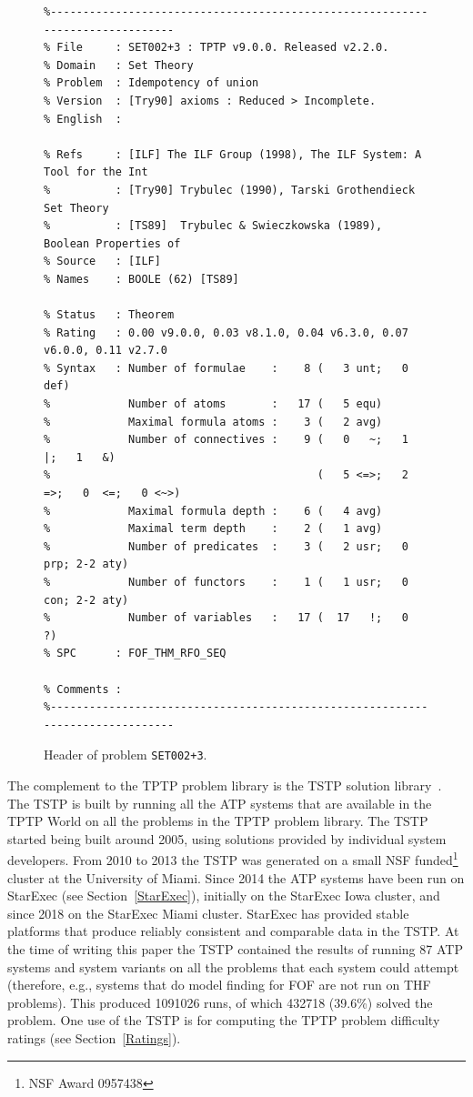 \documentclass[runningheads]{llncs}
\begin{document}
\begin{figure}[htb]
\centering
{\scriptsize
{\setlength{\baselineskip}{2.5mm}
\begin{verbatim}
%------------------------------------------------------------------------------
% File     : SET002+3 : TPTP v9.0.0. Released v2.2.0.
% Domain   : Set Theory
% Problem  : Idempotency of union
% Version  : [Try90] axioms : Reduced > Incomplete.
% English  :

% Refs     : [ILF] The ILF Group (1998), The ILF System: A Tool for the Int
%          : [Try90] Trybulec (1990), Tarski Grothendieck Set Theory
%          : [TS89]  Trybulec & Swieczkowska (1989), Boolean Properties of
% Source   : [ILF]
% Names    : BOOLE (62) [TS89]

% Status   : Theorem
% Rating   : 0.00 v9.0.0, 0.03 v8.1.0, 0.04 v6.3.0, 0.07 v6.0.0, 0.11 v2.7.0
% Syntax   : Number of formulae    :    8 (   3 unt;   0 def)
%            Number of atoms       :   17 (   5 equ)
%            Maximal formula atoms :    3 (   2 avg)
%            Number of connectives :    9 (   0   ~;   1   |;   1   &)
%                                         (   5 <=>;   2  =>;   0  <=;   0 <~>)
%            Maximal formula depth :    6 (   4 avg)
%            Maximal term depth    :    2 (   1 avg)
%            Number of predicates  :    3 (   2 usr;   0 prp; 2-2 aty)
%            Number of functors    :    1 (   1 usr;   0 con; 2-2 aty)
%            Number of variables   :   17 (  17   !;   0   ?)
% SPC      : FOF_THM_RFO_SEQ

% Comments :
%------------------------------------------------------------------------------
\end{verbatim}
}}
\caption{Header of problem {\tt SET002+3}.}
\label{ExampleHeader}
\end{figure}

The complement to the TPTP problem library is the TSTP solution library~\cite{Sut07-CSR,Sut10}.
The TSTP is built by running all the ATP systems that are available in the TPTP World on
all the problems in the TPTP problem library.
The TSTP started being built around 2005, using solutions provided by individual system developers.
From 2010 to 2013 the TSTP was generated on a small NSF funded\footnote{%
NSF Award 0957438} cluster at the University of Miami.
Since 2014 the ATP systems have been run on StarExec (see Section~\ref{StarExec}), initially on 
the StarExec Iowa cluster, and since 2018 on the StarExec Miami cluster.
StarExec has provided stable platforms that produce reliably consistent and comparable data in 
the TSTP.
At the time of writing this paper the TSTP contained the results of running 87 ATP systems and 
system variants on all the problems that each system could attempt
(therefore, e.g., systems that do model finding for FOF are not run on THF problems).
This produced 1091026 runs, of which 432718 (39.6\%) solved the problem.
One use of the TSTP is for computing the TPTP problem difficulty ratings (see 
Section~\ref{Ratings}).
\end{document}
